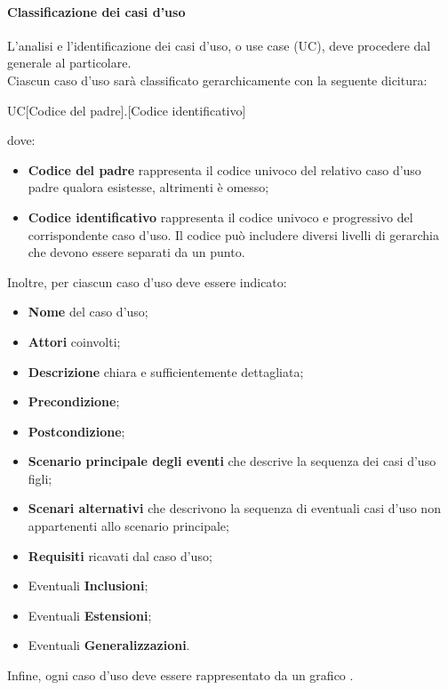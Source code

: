 \documentclass[../NormeDiProgetto.tex]{subfiles}
\begin{document}
				\paragraph{Classificazione dei casi d'uso\\}
					L'analisi e l'identificazione dei casi d'uso, o use case (UC), deve
					procedere dal generale al particolare.\\
					Ciascun caso d'uso sarà classificato gerarchicamente con la seguente dicitura:
					\begin{center}
						UC[Codice del padre].[Codice identificativo]
					\end{center}
					dove:
					\begin{itemize}
						\item \textbf{Codice del padre} rappresenta il codice univoco
						del relativo caso d'uso padre qualora esistesse, altrimenti è omesso;
						\item \textbf{Codice identificativo} rappresenta il codice
						univoco e progressivo del corrispondente caso d'uso. Il codice
						può includere diversi livelli di gerarchia che devono essere
						separati da un punto.
					\end{itemize}
					Inoltre, per ciascun caso d'uso deve essere indicato:
					\begin{itemize}
						\item \textbf{Nome} del caso d'uso;
						\item \textbf{Attori} coinvolti;
						\item \textbf{Descrizione} chiara e sufficientemente
						dettagliata;
						\item \textbf{Precondizione};
						\item \textbf{Postcondizione};
						\item \textbf{Scenario principale degli eventi} che descrive
						la sequenza dei casi d'uso figli;
						\item \textbf{Scenari alternativi} che descrivono la sequenza
						di eventuali casi d'uso non appartenenti allo scenario
						principale;
						\item \textbf{Requisiti} ricavati dal caso d'uso;
						\item Eventuali \textbf{Inclusioni};
						\item Eventuali \textbf{Estensioni};
						\item Eventuali \textbf{Generalizzazioni}.
					\end{itemize}
					Infine, ogni caso d'uso deve essere rappresentato da un grafico .
	
\end{document}
